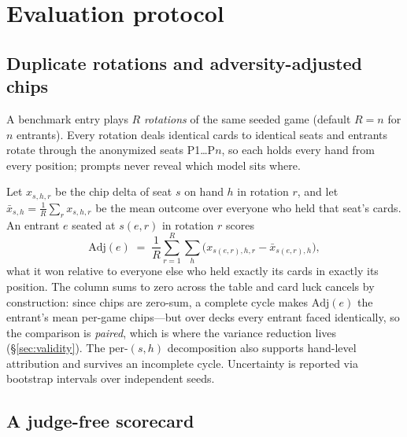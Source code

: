 \documentclass{article}
\begin{document}
\section{Evaluation protocol}
\label{sec:protocol}

\subsection{Duplicate rotations and adversity-adjusted chips}
\label{sec:duplicate}

A benchmark entry plays $R$ \emph{rotations} of the same seeded game
(default $R = n$ for $n$ entrants). Every rotation deals identical cards to
identical seats and entrants rotate through the anonymized seats
P1\ldots P$n$, so each holds every hand from every position; prompts never
reveal which model sits where.

Let $x_{s,h,r}$ be the chip delta of seat $s$ on hand $h$ in rotation $r$,
and let $\bar{x}_{s,h} = \frac{1}{R}\sum_r x_{s,h,r}$ be the mean outcome
over everyone who held that seat's cards. An entrant $e$ seated at
$s(e,r)$ in rotation $r$ scores
\begin{equation}
\label{eq:adjusted}
\mathrm{Adj}(e) \;=\; \frac{1}{R} \sum_{r=1}^{R} \sum_{h}
\bigl( x_{s(e,r),h,r} - \bar{x}_{s(e,r),h} \bigr),
\end{equation}
what it won relative to everyone else who held exactly its cards in exactly
its position. The column sums to zero across the table and card luck
cancels by construction: since chips are zero-sum, a complete cycle makes
$\mathrm{Adj}(e)$ the entrant's mean per-game chips---but over decks every
entrant faced identically, so the comparison is \emph{paired}, which is
where the variance reduction lives (\S\ref{sec:validity}). The per-$(s,h)$
decomposition also supports hand-level attribution and survives an
incomplete cycle. Uncertainty is reported via bootstrap intervals over
independent seeds.

\subsection{A judge-free scorecard}
\label{sec:scorecard}
\end{document}
